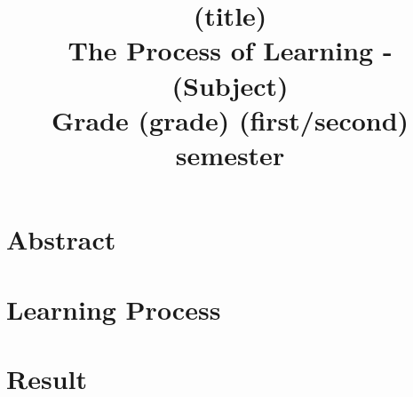 \documentclass[12pt]{article}
\title{
    {\Huge (title)}\\
    {\LARGE The Process of Learning - (Subject)}\\
    {\Large Grade (grade) (first/second) semester}\\
    $$ $$
}
\author{\LARGE }
\date{\Large }
\newcommand{\tab}{\hspace*{2em}}
\begin{document}
\maketitle

\newpage

\section{\LARGE Abstract}
\LARGE
\tab 

\section{\LARGE Learning Process}
\LARGE
\tab 

\par
\tab 


\section{\LARGE Result}
\LARGE
\tab 

\par
\tab 
\end{document}
